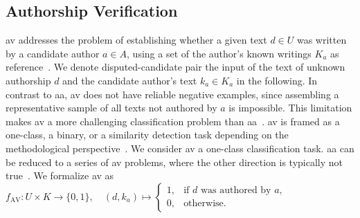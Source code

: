 \subsection{Authorship Verification}
\ac{av} addresses the problem of establishing whether a given text $d \in U$ was written by a candidate author $a \in A$, using a set of the author’s known writings $K_a$ as reference~\citep{koppel_authorship_2004}.
We denote disputed-candidate pair the input of the text of unknown authorship $d$ and the candidate author's text $k_a \in K_a$ in the following.
In contrast to \ac{aa}, \ac{av} does not have reliable negative examples, since assembling a representative sample of all texts not authored by 
$a$ is impossible. 
This limitation makes \ac{av} a more challenging classification problem than \ac{aa}~\citep{llm_detection_av_2025,neal_surveying_2018,koppel_authorship_2004}.
\ac{av} is framed as a one-class, a binary, or a similarity detection task depending on the methodological perspective~\citep{neal_surveying_2018,koppel_authorship_2004}.  
We consider \ac{av} a one-class classification task.
\ac{aa} can be reduced to a series of \ac{av} problems, where the other direction is typically not true~\citep{barlas_cross_domain_2020,tyo_state_2022}.
We formalize \ac{av} as $f_{\text{AV}} : U \times K \to \{0,1\}, \quad
(d, k_a) \mapsto 
\begin{cases} 
1, & \text{if } d \text{ was authored by } a,\\
0, & \text{otherwise.}
\end{cases}
$



